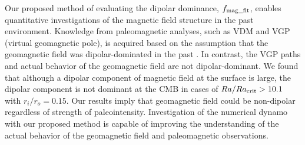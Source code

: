 Our proposed method of evaluating the dipolar dominance, $f_{\rm mag\_fit}$, enables quantitative investigations of the magnetic field structure in the past environment. 
Knowledge from paleomagnetic analyses, such as VDM and VGP (virtual geomagnetic pole), is acquired based on the assumption that the geomagnetic field was dipolar-dominated in the past \cite{Merrill:1996}. 
In contrast, the VGP paths and actual behavior of the geomagnetic field are not dipolar-dominant. 
{\color{red}
We found that although a dipolar component of magnetic field at the surface is large, the dipolar component is not dominant at the CMB in cases of $Ra/Ra_{\rm crit} > 10.1$ with $r_i/r_o = 0.15$. 
Our results imply that geomagnetic field could be non-dipolar regardless of strength of paleointensity.} 
Investigation of the numerical dynamo with our proposed method is capable of improving the understanding of the actual behavior of the geomagnetic field and paleomagnetic observations.
